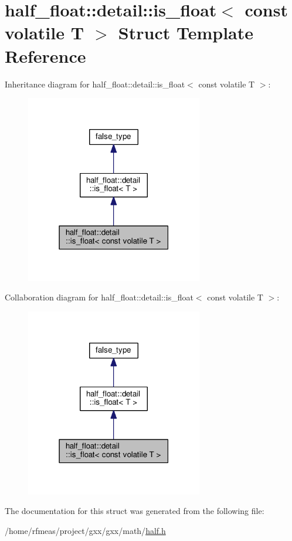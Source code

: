 \hypertarget{structhalf__float_1_1detail_1_1is__float_3_01const_01volatile_01T_01_4}{}\section{half\+\_\+float\+:\+:detail\+:\+:is\+\_\+float$<$ const volatile T $>$ Struct Template Reference}
\label{structhalf__float_1_1detail_1_1is__float_3_01const_01volatile_01T_01_4}


Inheritance diagram for half\+\_\+float\+:\+:detail\+:\+:is\+\_\+float$<$ const volatile T $>$\+:
\nopagebreak
\begin{figure}[H]
\begin{center}
\leavevmode
\includegraphics[width=219pt]{structhalf__float_1_1detail_1_1is__float_3_01const_01volatile_01T_01_4__inherit__graph}
\end{center}
\end{figure}


Collaboration diagram for half\+\_\+float\+:\+:detail\+:\+:is\+\_\+float$<$ const volatile T $>$\+:
\nopagebreak
\begin{figure}[H]
\begin{center}
\leavevmode
\includegraphics[width=219pt]{structhalf__float_1_1detail_1_1is__float_3_01const_01volatile_01T_01_4__coll__graph}
\end{center}
\end{figure}


The documentation for this struct was generated from the following file\+:\begin{DoxyCompactItemize}
\item 
/home/rfmeas/project/gxx/gxx/math/\hyperlink{half_8h}{half.\+h}\end{DoxyCompactItemize}
